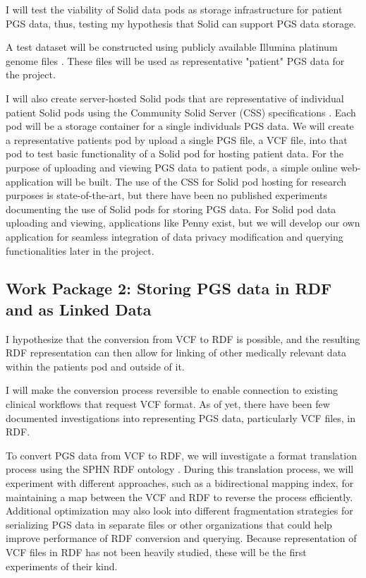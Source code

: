 \documentclass[runningheads]{llncs}
\begin{document}
I will test the viability of Solid data pods as storage infrastructure for patient PGS data, thus, testing my hypothesis that Solid can support PGS data storage. 

A test dataset will be constructed using publicly available Illumina platinum genome files \cite{noauthor_platinum_nodate}. 
These files will be used as representative "patient" PGS data for the project. 

I will also create server-hosted Solid pods that are representative of individual patient Solid pods using the Community Solid Server (CSS) specifications \cite{css}. 
Each pod will be a storage container for a single individual\textquotesingle s PGS data. 
We will create a representative patient\textquotesingle s pod by upload a single PGS file, a VCF file, into that pod to test basic functionality of a Solid pod for hosting patient data. 
For the purpose of uploading and viewing PGS data to patient pods, a simple online web-application will be built.
The use of the CSS for Solid pod hosting for research purposes is state-of-the-art, but there have been no published experiments documenting the use of Solid pods for storing PGS data. 
For Solid pod data uploading and viewing, applications like Penny \cite{penny} exist, but we will develop our own application for seamless integration of data privacy modification and querying functionalities later in the project. 


\subsection{Work Package 2:  Storing PGS data in RDF and as Linked Data}

I hypothesize that the conversion from VCF to RDF is possible, and the resulting RDF representation can then allow for linking of other medically relevant data within the patient\textquotesingle s pod and outside of it.

I will make the conversion process reversible to enable connection to existing clinical workflows that request VCF format. 
As of yet, there have been few documented investigations into representing PGS data, particularly VCF files, in RDF. 

To convert PGS data from VCF to RDF, we will investigate a format translation process using the SPHN RDF ontology \cite{van_der_horst_bridging_2023}. 
During this translation process, we will experiment with different approaches, such as a bidirectional mapping index, for maintaining a map between the VCF and RDF to reverse the process efficiently.
Additional optimization may also look into different fragmentation strategies for serializing PGS data in separate files or other organizations that could help improve performance of RDF conversion and querying.
Because representation of VCF files in RDF has not been heavily studied, these will be the first experiments of their kind.
\end{document}

